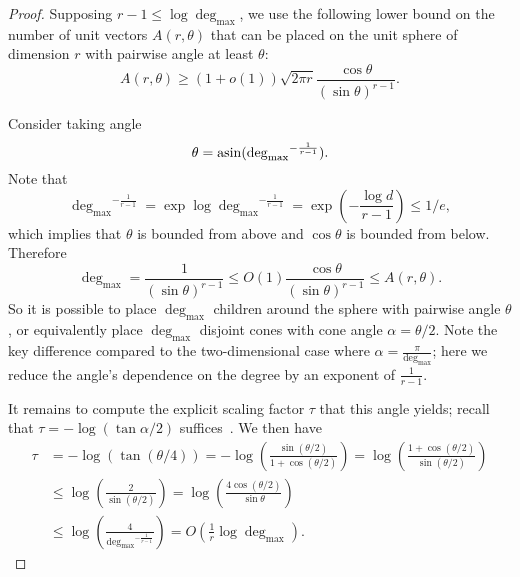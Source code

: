 \begin{proof}
Supposing $r-1 \le \log \operatorname{deg}_{\max}$, we use the following lower bound \cite{Jenssen} on the number of unit vectors $A(r,\theta)$ that can be placed on the unit sphere of dimension $r$ with pairwise angle at least $\theta$:
\[A(r, \theta) \geq (1+o(1)) \sqrt{2\pi r} \frac{\cos \theta}{(\sin \theta)^{r-1}}.\]

Consider taking angle
\[\theta = \operatorname{asin}({\operatorname{deg}_{\max}}^{-\frac{1}{r-1}}).\]
Note that
\[
  {\operatorname{deg}_{\max}}^{-\frac{1}{r-1}} = \exp \log {\operatorname{deg}_{\max}}^{-\frac{1}{r-1}} = \exp\left( -\frac{\log d}{r-1} \right) \le 1/e,
\]
which implies that $\theta$ is bounded from above and $\cos \theta$ is bounded from below.
Therefore
\[
  \operatorname{deg}_{\max} = \frac{1}{(\sin \theta)^{r-1}} \le O(1)\frac{\cos \theta}{(\sin \theta)^{r-1}} \le A(r,\theta).
\]
So it is possible to place $\operatorname{deg}_{\max}$ children around the sphere with pairwise angle $\theta$, or equivalently place $\operatorname{deg}_{\max}$ disjoint cones with cone angle $\alpha = \theta/2$.
Note the key difference compared to the two-dimensional case where $\alpha = \frac{\pi}{\operatorname{deg}_{\max}}$; here we reduce the angle's dependence on the degree by an exponent of $\frac{1}{r-1}$.

It remains to compute the explicit scaling factor $\tau$ that this angle yields; recall that $\tau = -\log( \tan \alpha/2)$ suffices~\cite{sarkar}.
We then have
\begin{align*}
  \tau &= -\log(\tan(\theta/4)) = -\log \left(\frac{\sin (\theta/2)}{1+\cos (\theta/2)} \right) = \log \left(\frac{1+\cos (\theta/2)}{\sin (\theta/2)} \right)
  \\&\le \log \left( \frac{2}{\sin(\theta/2)} \right) = \log \left( \frac{4\cos(\theta/2)}{\sin \theta} \right)
  \\&\le \log \left( \frac{4}{{\operatorname{deg}_{\max}}^{-\frac{1}{r-1}}} \right) = O\left(\frac{1}{r} \log \operatorname{deg}_{\max }\right)
  .
\end{align*}


\end{proof}
